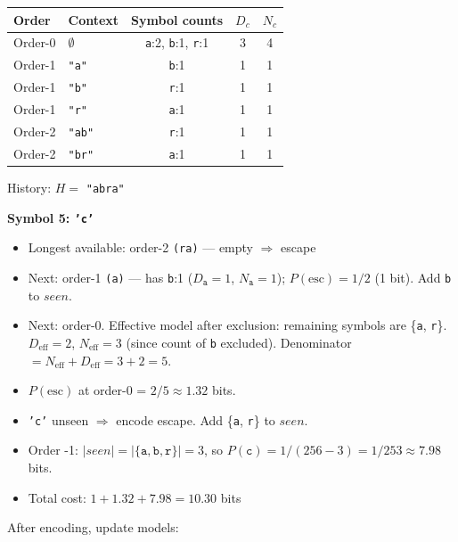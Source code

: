 \begin{examplebox}
\begin{center}
\footnotesize
\begin{tabular}{|l|l|c|c|c|}
\hline
\textbf{Order} & \textbf{Context} & \textbf{Symbol counts} & $D_c$ & $N_c$ \\
\hline
Order-0 & $\emptyset$ & \texttt{a}:2, \texttt{b}:1, \texttt{r}:1 & 3 & 4 \\
Order-1 & \texttt{"a"} & \texttt{b}:1 & 1 & 1 \\
Order-1 & \texttt{"b"} & \texttt{r}:1 & 1 & 1 \\
Order-1 & \texttt{"r"} & \texttt{a}:1 & 1 & 1 \\
Order-2 & \texttt{"ab"} & \texttt{r}:1 & 1 & 1 \\
Order-2 & \texttt{"br"} & \texttt{a}:1 & 1 & 1 \\
\hline
\end{tabular}
\end{center}
History: $H =$ \texttt{"abra"}

\bigskip
\textbf{Symbol 5: \texttt{'c'}}
\begin{itemize}
    \item Longest available: order-2 \texttt{(ra)} — empty $\Rightarrow$ escape
    \item Next: order-1 \texttt{(a)} — has \texttt{b}:1 ($D_{\texttt{a}}=1$, $N_{\texttt{a}}=1$); $P(\text{esc}) = 1/2$ (1 bit). Add \texttt{b} to $seen$.
    \item Next: order-0. Effective model after exclusion: remaining symbols are \{\texttt{a}, \texttt{r}\}. $D_{\mathrm{eff}} = 2$, $N_{\mathrm{eff}} = 3$ (since count of \texttt{b} excluded). Denominator $= N_{\mathrm{eff}} + D_{\mathrm{eff}} = 3+2=5$.
    \item $P(\text{esc})$ at order-0 = $2/5 \approx 1.32$ bits.
    \item \texttt{'c'} unseen $\Rightarrow$ encode escape. Add \{\texttt{a}, \texttt{r}\} to $seen$.
    \item Order -1: $|seen| = |\{\texttt{a}, \texttt{b}, \texttt{r}\}| = 3$, so $P(\texttt{c}) = 1/(256-3) = 1/253 \approx 7.98$ bits.
    \item Total cost: $1 + 1.32 + 7.98 = 10.30$ bits
\end{itemize}
After encoding, update models:


\end{examplebox}

